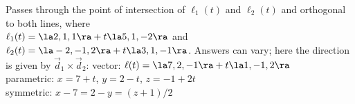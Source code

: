 {Passes through the point of intersection of $\ell_1(t)$ and $\ell_2(t)$ and orthogonal to both lines, where\\
$\ell_1(t) = \la 2,1,1\ra + t\la5,1,-2\ra$ and \\$\ell_2(t) = \la-2,-1,2\ra+t\la 3,1,-1\ra$.
}
{Answers can vary; here the direction is given by $\vec d_1\times \vec d_2$:
vector: $\ell(t) = \la 7,2,-1\ra + t\la 1,-1,2\ra$\\
parametric: $x= 7+t$, $y=2-t$, $z = -1+2t$\\
symmetric: $x-7=2-y=(z+1)/2$
}

